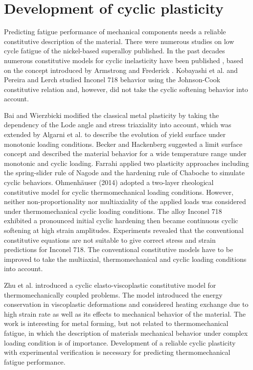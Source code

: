 \section{Development of cyclic plasticity}
\noindent
Predicting fatigue performance of mechanical components needs a reliable constitutive description of the material. There were numerous studies on low cycle fatigue of the nickel-based superalloy published. In the past decades numerous constitutive models for cyclic inelasticity have been published \cite{ohno1993kinematic, Pun2014138, AbdelKarim2000225, Kang2004299}, based on the concept introduced by Armstrong and Frederick \cite{armstrong1966mathematical}. Kobayashi et al. \cite{Kobayashi2008389} and Pereira and Lerch \cite{Pereira2001715} studied Inconel 718 behavior using the Johnson-Cook constitutive relation and, however, did not take the cyclic softening behavior into account. 

Bai and Wierzbicki \cite{Bai20081071} modified the classical metal plasticity by taking the dependency of the Lode angle and stress triaxiality into account, which was extended by Algarni et al. \cite{Algarni2015140} to describe the evolution of yield surface under monotonic loading conditions. Becker and Hackenberg \cite{Becker2011596} suggested a limit surface concept and described the material behavior for a wide temperature range under monotonic and cyclic loading.
Farrahi \cite{Farrahi2014245} applied two plasticity approaches including the spring-slider rule of Nagode and the hardening rule of Chaboche to simulate cyclic behaviors.
Ohmenh\"{a}user (2014) \cite{Ohmenhauser2014631} adopted a two-layer rheological constitutive model for cyclic thermomechanical loading conditions.
However, neither non-proportionality nor multiaxiality of the applied loads was considered under thermomechanical cyclic loading conditions.
The alloy Inconel 718 exhibited a pronounced initial cyclic hardening then became continuous cyclic softening at high strain amplitudes. Experiments revealed that the conventional constitutive equations are not suitable to give correct stress and strain predictions for Inconel 718. The conventional constitutive models have to be improved to take the multiaxial, thermomechanical and cyclic loading conditions into account.

Zhu et al. \cite{ZHU2016} introduced a cyclic elasto-viscoplastic constitutive model for thermomechanically coupled problems. The model introduced the energy conservation in viscoplastic deformations and considered heating exchange due to high strain rate as well as its effects to mechanical behavior of the material. The work is interesting for metal forming, but not related to thermomechanical fatigue, in which the description of materials mechanical behavior under complex loading condition is of importance. 
Development of a reliable cyclic plasticity with experimental verification is necessary for predicting thermomechanical fatigue performance.

